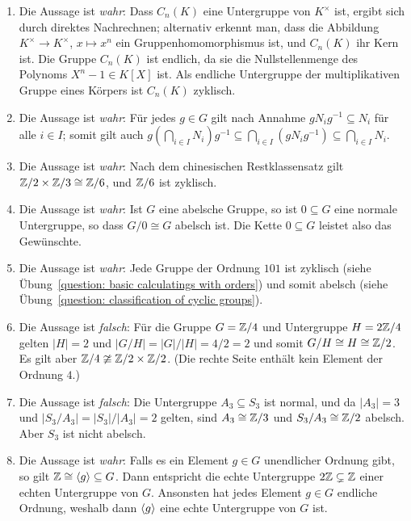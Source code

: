 \begin{solution}
  \begin{enumerate}
    \item
      Die Aussage ist \emph{wahr}:
      Dass $C_n(K)$ eine Untergruppe von $K^\times$ ist, ergibt sich durch direktes Nachrechnen;
      alternativ erkennt man, dass die Abbildung $K^\times \to K^\times$, $x \mapsto x^n$ ein Gruppenhomomorphismus ist, und $C_n(K)$ ihr Kern ist.
      Die Gruppe $C_n(K)$ ist endlich, da sie die Nullstellenmenge des Polynoms $X^n - 1 \in K[X]$ ist.
      Als endliche Untergruppe der multiplikativen Gruppe eines Körpers ist $C_n(K)$ zyklisch.
    \item
      Die Aussage ist \emph{wahr}:
      Für jedes $g \in G$ gilt nach Annahme $g N_i g^{-1} \subseteq N_i$ für alle $i \in I$;
      somit gilt auch $g \left( \bigcap_{i \in I} N_i \right) g^{-1} \subseteq \bigcap_{i \in I} (g N_i g^{-1}) \subseteq \bigcap_{i \in I} N_i$.
    \item
      Die Aussage ist \emph{wahr}:
      Nach dem chinesischen Restklassensatz gilt $\mathbb{Z}/2 \times \mathbb{Z}/3 \cong \mathbb{Z}/6$, und $\mathbb{Z}/6$ ist zyklisch.
    \item
      Die Aussage ist \emph{wahr}:
      Ist $G$ eine abelsche Gruppe, so ist $0 \subseteq G$ eine normale Untergruppe, so dass $G/0 \cong G$ abelsch ist.
      Die Kette $0 \subseteq G$ leistet also das Gewünschte.
    \item
      Die Aussage ist \emph{wahr}:
      Jede Gruppe der Ordnung $101$ ist zyklisch (siehe Übung~\ref{question: basic calculatings with orders}) und somit abelsch (siehe Übung~\ref{question: classification of cyclic groups}).
    \item
      Die Aussage ist \emph{falsch}:
      Für die Gruppe $G = \mathbb{Z}/4$ und Untergruppe $H = 2\mathbb{Z}/4$ gelten $|H| = 2$ und $|G/H| = |G|/|H| = 4/2 = 2$ und somit $G/H \cong H \cong \mathbb{Z}/2$.
      Es gilt aber $\mathbb{Z}/4 \ncong \mathbb{Z}/2 \times \mathbb{Z}/2$.
      (Die rechte Seite enthält kein Element der Ordnung $4$.)
    \item
      Die Aussage ist \emph{falsch}:
      Die Untergruppe $A_3 \subseteq S_3$ ist normal, und da $|A_3| = 3$ und $|S_3/A_3| = |S_3|/|A_3| = 2$ gelten, sind $A_3 \cong \mathbb{Z}/3$ und $S_3/A_3 \cong \mathbb{Z}/2$ abelsch.
      Aber $S_3$ ist nicht abelsch.
    \item
      Die Aussage ist \emph{wahr}:
      Falls es ein Element $g \in G$ unendlicher Ordnung gibt, so gilt $\mathbb{Z} \cong \langle g\rangle \subseteq G$.
      Dann entspricht die echte Untergruppe $2\mathbb{Z} \subsetneq \mathbb{Z}$ einer echten Untergruppe von $G$.
      Ansonsten hat jedes Element $g \in G$ endliche Ordnung, weshalb dann $\langle g\rangle$ eine echte Untergruppe von $G$ ist.
  \end{enumerate}
\end{solution}


